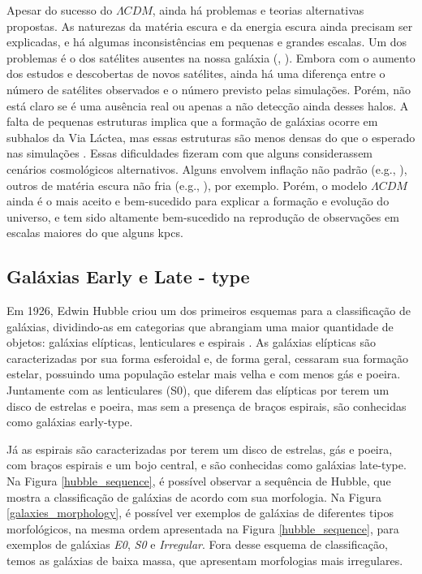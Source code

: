 Apesar do sucesso do $\Lambda CDM$, ainda há problemas e teorias alternativas propostas. As naturezas da matéria escura e da energia escura ainda precisam ser explicadas, e há algumas inconsistências em pequenas e grandes escalas. Um dos problemas é o dos satélites ausentes na nossa galáxia (\citealp{Klypin_1999}, \citealp{Moore_1999}). Embora com o aumento dos estudos e descobertas de novos satélites, ainda há uma diferença entre o número de satélites observados e o número previsto pelas simulações. Porém, não está claro se é uma ausência real ou apenas a não detecção ainda desses halos. A falta de pequenas estruturas implica que a formação de galáxias ocorre em subhalos da Via Láctea, mas essas estruturas são menos densas do que o esperado nas simulações \citep{Boylan_Kolchin_2011}. Essas dificuldades fizeram com que alguns considerassem cenários cosmológicos alternativos. Alguns envolvem inflação não padrão (e.g., \citealp{Kamionkowski_2000}), outros de matéria escura não fria (e.g., \citealp{Murgia_2017}), por exemplo. Porém, o modelo $\Lambda CDM$ ainda é o mais aceito e bem-sucedido para explicar a formação e evolução do universo, e tem sido altamente bem-sucedido na reprodução de observações em escalas maiores do que alguns kpcs.


\subsection{Galáxias Early e Late - type}\label{subsec:Galaxia_early_late}
Em 1926, Edwin Hubble criou um dos primeiros esquemas para a classificação de galáxias, dividindo-as em categorias que abrangiam uma maior quantidade de objetos: galáxias elípticas, lenticulares e espirais \citep{hubble_classification_1926}. As galáxias elípticas são caracterizadas por sua forma esferoidal e, de forma geral, cessaram sua formação estelar, possuindo uma população estelar mais velha e com menos gás e poeira. Juntamente com as lenticulares (S0), que diferem das elípticas por terem um disco de estrelas e poeira, mas sem a presença de braços espirais, são conhecidas como galáxias early-type.

Já as espirais são caracterizadas por terem um disco de estrelas, gás e poeira, com braços espirais e um bojo central, e são conhecidas como galáxias late-type. Na Figura \ref{hubble_sequence}, é possível observar a sequência de Hubble, que mostra a classificação de galáxias de acordo com sua morfologia. Na Figura \ref{galaxies_morphology}, é possível ver exemplos de galáxias de diferentes tipos morfológicos, na mesma ordem apresentada na Figura \ref{hubble_sequence}, para exemplos de galáxias \textit{E0}, \textit{S0} e \textit{Irregular}. Fora desse esquema de classificação, temos as galáxias de baixa massa, que apresentam morfologias mais irregulares.

